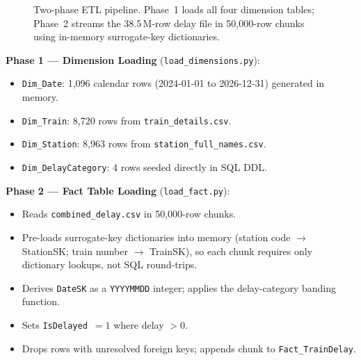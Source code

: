 \documentclass[conference]{IEEEtran}
\begin{document}
\begin{figure}[htbp]
  \centering
  \caption{Two-phase ETL pipeline.
           Phase~1 loads all four dimension tables; Phase~2 streams
           the 38.5\,M-row delay file in 50,000-row chunks using
           in-memory surrogate-key dictionaries.}
  \label{fig:etl_pipeline}
\end{figure}

\textbf{Phase 1 --- Dimension Loading} (\texttt{load\_dimensions.py}):
\begin{itemize}
  \item \texttt{Dim\_Date}: 1,096 calendar rows (2024-01-01 to
        2026-12-31) generated in memory.
  \item \texttt{Dim\_Train}: 8,720 rows from
        \texttt{train\_details.csv}.
  \item \texttt{Dim\_Station}: 8,963 rows from
        \texttt{station\_full\_names.csv}.
  \item \texttt{Dim\_DelayCategory}: 4 rows seeded directly in SQL DDL.
\end{itemize}

\textbf{Phase 2 --- Fact Table Loading} (\texttt{load\_fact.py}):
\begin{itemize}
  \item Reads \texttt{combined\_delay.csv} in 50,000-row chunks.
  \item Pre-loads surrogate-key dictionaries into memory
        (station code $\to$ StationSK; train number $\to$ TrainSK),
        so each chunk requires only dictionary lookups, not SQL
        round-trips.
  \item Derives \texttt{DateSK} as a \texttt{YYYYMMDD} integer; applies
        the delay-category banding function.
  \item Sets \texttt{IsDelayed}~$= 1$ where delay $> 0$.
  \item Drops rows with unresolved foreign keys; appends chunk to
        \texttt{Fact\_TrainDelay}.
\end{itemize}
\end{document}
